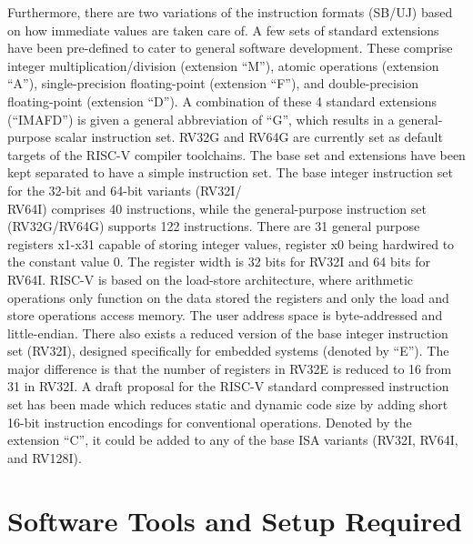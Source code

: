 Furthermore, there are two variations of the instruction formats (SB/UJ) based on how immediate values are taken care of. A few sets of standard extensions have been pre-defined to cater to general software development. These comprise integer multiplication/division (extension “M”), atomic operations (extension “A”), single-precision floating-point (extension “F”), and double-precision floating-point (extension “D”). A combination of these 4 standard extensions (“IMAFD”) is given a general abbreviation of “G”, which results in a general-purpose scalar instruction set. RV32G and RV64G are currently set as default targets of the RISC-V compiler toolchains. The base set and extensions have been kept separated to have a simple instruction set. \newline\newline
The base integer instruction set for the 32-bit and 64-bit variants (RV32I/\\RV64I) comprises 40 instructions, while the general-purpose instruction set (RV32G/RV64G) supports 122 instructions. There are 31 general purpose registers x1-x31 capable of storing integer values, register x0 being hardwired to the constant value 0. The register width is 32 bits for RV32I and 64 bits for RV64I. RISC-V is based on the load-store architecture, where arithmetic operations only function on the data stored the registers and only the load and store operations access memory. The user address space is byte-addressed and little-endian. \newline\newline
There also exists a reduced version of the base integer instruction set (RV32I), designed specifically for embedded systems (denoted by “E”). The major difference is that the number of registers in RV32E is reduced to 16 from 31 in RV32I. A draft proposal for the RISC-V standard compressed instruction set has been made which reduces static and dynamic code size by adding short 16-bit instruction encodings for conventional operations. Denoted by the extension “C”, it could be added to any of the base ISA variants (RV32I, RV64I, and RV128I). 

 \section{Software Tools and Setup Required}
  \label{sect6_2}

